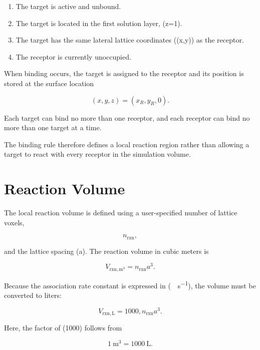 \documentclass[11pt]{article}
\begin{document}
\begin{enumerate}
\item The target is active and unbound.
\item The target is located in the first solution layer, (z=1).
\item The target has the same lateral lattice coordinates ((x,y)) as the receptor.
\item The receptor is currently unoccupied.
\end{enumerate}

When binding occurs, the target is assigned to the receptor and its position is stored at the surface location

\begin{equation}
(x,y,z)=(x_R,y_R,0).
\end{equation}

Each target can bind no more than one receptor, and each receptor can bind no more than one target at a time.

The binding rule therefore defines a local reaction region rather than allowing a target to react with every receptor in the simulation volume.

\section{Reaction Volume}

The local reaction volume is defined using a user-specified number of lattice voxels,

\begin{equation}
n_{\mathrm{rxn}},
\end{equation}

and the lattice spacing (a). The reaction volume in cubic meters is

\begin{equation}
V_{\mathrm{rxn,m^3}}
=
n_{\mathrm{rxn}}a^3.
\end{equation}

Because the association rate constant is expressed in
(\si{\per\molar\per\second}), the volume must be converted to liters:

\begin{equation}
V_{\mathrm{rxn,L}}
=
1000,n_{\mathrm{rxn}}a^3.
\end{equation}

Here, the factor of (1000) follows from

\begin{equation}
1~\si{\meter\cubed}
=
1000~\si{\liter}.
\end{equation}
\end{document}
